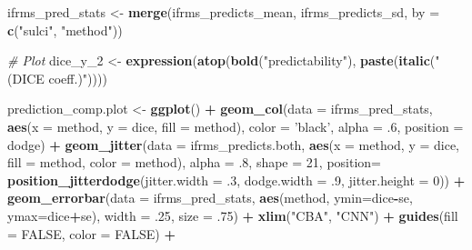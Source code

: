 \documentclass[
]{article}
\newenvironment{Shaded}{\begin{snugshade}}{\end{snugshade}}
\newcommand{\CommentTok}[1]{\textcolor[rgb]{0.56,0.35,0.01}{\textit{#1}}}
\newcommand{\DataTypeTok}[1]{\textcolor[rgb]{0.13,0.29,0.53}{#1}}
\newcommand{\DecValTok}[1]{\textcolor[rgb]{0.00,0.00,0.81}{#1}}
\newcommand{\FloatTok}[1]{\textcolor[rgb]{0.00,0.00,0.81}{#1}}
\newcommand{\KeywordTok}[1]{\textcolor[rgb]{0.13,0.29,0.53}{\textbf{#1}}}
\newcommand{\NormalTok}[1]{#1}
\newcommand{\OperatorTok}[1]{\textcolor[rgb]{0.81,0.36,0.00}{\textbf{#1}}}
\newcommand{\OtherTok}[1]{\textcolor[rgb]{0.56,0.35,0.01}{#1}}
\newcommand{\StringTok}[1]{\textcolor[rgb]{0.31,0.60,0.02}{#1}}
\begin{document}
\begin{Shaded}
\begin{Highlighting}[]
\NormalTok{ifrms_pred_stats <-}\StringTok{ }\KeywordTok{merge}\NormalTok{(ifrms_predicts_mean, ifrms_predicts_sd, }\DataTypeTok{by =} \KeywordTok{c}\NormalTok{(}\StringTok{"sulci"}\NormalTok{, }\StringTok{"method"}\NormalTok{))}

\CommentTok{# Plot}
\NormalTok{dice_y_}\DecValTok{2}\NormalTok{ <-}\StringTok{ }\KeywordTok{expression}\NormalTok{(}\KeywordTok{atop}\NormalTok{(}\KeywordTok{bold}\NormalTok{(}\StringTok{"predictability"}\NormalTok{), }\KeywordTok{paste}\NormalTok{(}\KeywordTok{italic}\NormalTok{(}\StringTok{"(DICE coeff.)"}\NormalTok{))))}

\NormalTok{prediction_comp.plot <-}\StringTok{ }\KeywordTok{ggplot}\NormalTok{() }\OperatorTok{+}
\StringTok{  }\KeywordTok{geom_col}\NormalTok{(}\DataTypeTok{data =}\NormalTok{ ifrms_pred_stats, }\KeywordTok{aes}\NormalTok{(}\DataTypeTok{x =}\NormalTok{ method, }\DataTypeTok{y =}\NormalTok{ dice, }\DataTypeTok{fill =}\NormalTok{ method), }
           \DataTypeTok{color =} \StringTok{'black'}\NormalTok{, }\DataTypeTok{alpha =} \FloatTok{.6}\NormalTok{, }\DataTypeTok{position =}\NormalTok{ dodge) }\OperatorTok{+}
\StringTok{  }\KeywordTok{geom_jitter}\NormalTok{(}\DataTypeTok{data =}\NormalTok{ ifrms_predicts.both, }
              \KeywordTok{aes}\NormalTok{(}\DataTypeTok{x =}\NormalTok{ method, }\DataTypeTok{y =}\NormalTok{ dice, }\DataTypeTok{fill =}\NormalTok{ method, }\DataTypeTok{color =}\NormalTok{ method), }
              \DataTypeTok{alpha =} \FloatTok{.8}\NormalTok{, }\DataTypeTok{shape =} \DecValTok{21}\NormalTok{,}
              \DataTypeTok{position=}
                \KeywordTok{position_jitterdodge}\NormalTok{(}\DataTypeTok{jitter.width =} \FloatTok{.3}\NormalTok{, }\DataTypeTok{dodge.width =} \FloatTok{.9}\NormalTok{, }\DataTypeTok{jitter.height =} \DecValTok{0}\NormalTok{)) }\OperatorTok{+}
\StringTok{  }\KeywordTok{geom_errorbar}\NormalTok{(}\DataTypeTok{data =}\NormalTok{ ifrms_pred_stats, }
                \KeywordTok{aes}\NormalTok{(method, }\DataTypeTok{ymin=}\NormalTok{dice}\OperatorTok{-}\NormalTok{se, }\DataTypeTok{ymax=}\NormalTok{dice}\OperatorTok{+}\NormalTok{se),}
                \DataTypeTok{width =} \FloatTok{.25}\NormalTok{, }\DataTypeTok{size =} \FloatTok{.75}\NormalTok{) }\OperatorTok{+}
\StringTok{  }\KeywordTok{xlim}\NormalTok{(}\StringTok{"CBA"}\NormalTok{, }\StringTok{"CNN"}\NormalTok{) }\OperatorTok{+}
\StringTok{  }\KeywordTok{guides}\NormalTok{(}\DataTypeTok{fill =} \OtherTok{FALSE}\NormalTok{, }\DataTypeTok{color =} \OtherTok{FALSE}\NormalTok{) }\OperatorTok{+}

\end{Highlighting}
\end{Shaded}
\end{document}
